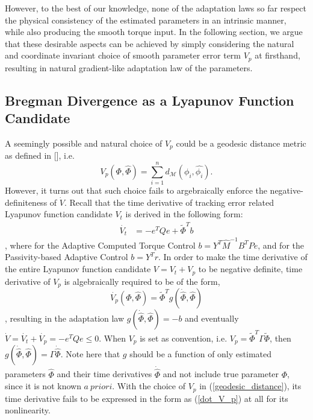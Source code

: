 \documentclass[Afour,sageh,times]{sagej}
\begin{document}
However, to the best of our knowledge, none of the adaptation laws so far respect the physical consistency of the estimated parameters in an intrinsic manner, while also producing the smooth torque input. In the following section, we argue that these desirable aspects can be achieved by simply considering the natural and coordinate invariant choice of smooth parameter error term $V_{p}$ at firsthand, resulting in natural gradient-like adaptation law of the parameters.
\subsection{Bregman Divergence as a Lyapunov Function Candidate}
A seemingly possible and natural choice of $V_{p}$ could be a geodesic distance metric as defined in [], i.e. 
\begin{equation}
V_{p}(\Phi,\hat{\Phi}) = \sum_{i=1}^{n} d_{\mathcal{M}}(\phi_{i}, \hat{\phi_{i}}). \label{geodesic_distance}
\end{equation}
However, it turns out that such choice fails to argebraically enforce the negative-definiteness of $\dot{V}$. Recall that the time derivative of tracking error related Lyapunov function candidate $V_{t}$ is derived in the following form:
\begin{align}
\dot{V_t} &= -e^{T}Qe +\tilde{\Phi}^{T}b \label{dot_V_t}
\end{align}
, where for the Adaptive Computed Torque Control $b = Y^T\hat{M}^{-1}B^{T}Pe$, and for the Passivity-based Adaptive Control $b = Y^{T}r$. In order to make the time derivative of the entire Lyapunov function candidate $V = V_{t}+V_{p}$ to be negative definite, time derivative of $V_{p}$ is algebraically required to be of the form,
\begin{equation}
\dot{V_{p}}(\Phi, \hat{\Phi})=\tilde{\Phi}^{T}g(\dot{\hat{\Phi}}, \hat{\Phi}) \label{dot_V_p}
\end{equation}
, resulting in the adaptation law $g(\dot{\hat{\Phi}}, \hat{\Phi}) = - b$ and eventually $\dot{V} =\dot{V_{t}}+\dot{V_{p}}= -e^{T}Qe \leq 0$. When $V_{p}$ is set as convention, i.e. $V_{p} = \tilde{\Phi}^{T}\Gamma\tilde{\Phi}$, then $g(\dot{\hat{\Phi}}, \hat{\Phi}) = \Gamma \dot{\hat{\Phi}}$. Note here that $g$ should be a function of only estimated parameters $\hat{\Phi}$ and their time derivatives $\dot{\hat{\Phi}}$ and not include true parameter $\Phi$, since it is not known $a \ priori$. With the choice of $V_{p}$ in (\ref{geodesic_distance}), its time derivative fails to be expressed in the form as (\ref{dot_V_p}) at all for its nonlinearity.
\end{document}
